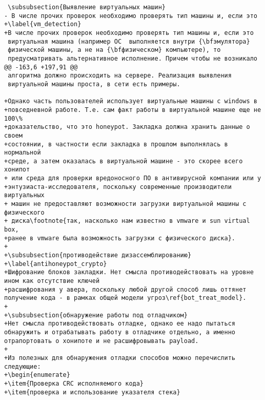 \begin{verbatim}
 \subsubsection{Выявление виртуальных машин}
- В числе прочих проверок необходимо проверять тип машины и, если это
+\label{vm_detection}
+В числе прочих проверок необходимо проверять тип машины и, если это
 виртуальная машина (например ОС  выполняется внутри {\bfэмулятора}
 физической машины, а не на {\bfфизическом} компьютере), то
 предусматривать альтернативное исполнение. Причем чтобы не возникало
@@ -163,6 +197,91 @@
 алгоритма должно происходить на сервере. Реализация выявления
 виртуальной машины проста, в сети есть примеры.

+Однако часть пользователей использует виртуальные машины с windows в
+повседневной работе. Т.е. сам факт работы в виртуальной машине еще не 100\%
+доказательство, что это honeypot. Закладка должна хранить данные о своем
+состоянии, в частности если закладка в прошлом выполнялась в нормальной
+среде, а затем оказалась в виртуальной машине - это скорее всего хонипот
+ или среда для проверки вредоносного ПО в антивирусной компании или у
+энтузиаста-исследователя, поскольку современные производители виртуальных
+ машин не предоставляют возможности загрузки виртуальной машины с физического
+ диска\footnote{так, насколько нам известно в vmware и sun virtual box,
+ранее в vmware была возможность загрузки с физического диска}.
+
+\subsubsection{противодействие дизассемблированию}
+\label{antihoneypot_crypto}
+Шифрование блоков закладки. Нет смысла противодействовать на уровне ином как отсутствие ключей
+расшифрования у авера, поскольку любой другой способ лишь оттянет получение кода - в рамках общей модели угроз\ref{bot_treat_model}.
+
+\subsubsection{обнаружение работы под отладчиком}
+Нет смысла противодействовать отладке, однако ее надо пытаться обнаружить и отрабатывать работу в отладчике отдельно, а именно отрапортовать о хонипоте и не расшифровывать payload.
+
+Из полезных для обнаружения отладки способов можно перечислить следующие:
+\begin{enumerate}
+\item{Проверка CRC исполняемого кода}
+\item{проверка и использование указателя стека}

\end{verbatim}
